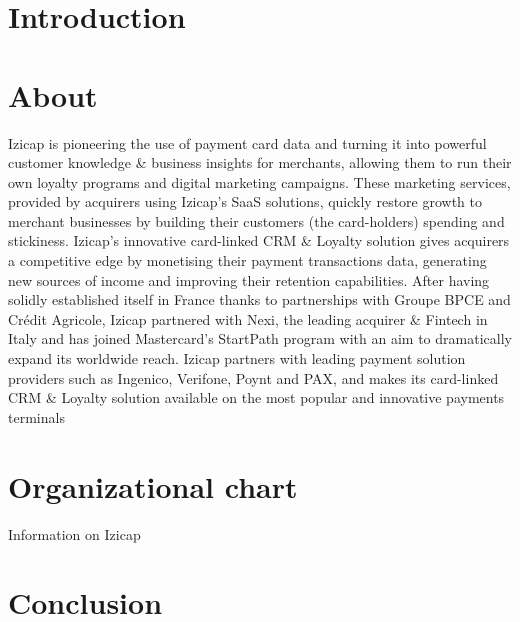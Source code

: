
\section*{Introduction}

\section{About}
Izicap is pioneering the use of payment card data and turning it into powerful customer knowledge \& business
insights for merchants, allowing them to run their own loyalty programs and digital marketing campaigns. These
marketing services, provided by acquirers using Izicap’s SaaS solutions, quickly restore growth to merchant
businesses by building their customers (the card-holders) spending and stickiness. Izicap’s innovative card-linked
CRM \& Loyalty solution gives acquirers a competitive edge by monetising their payment transactions data,
generating new sources of income and improving their retention capabilities. After having solidly established itself in
France thanks to partnerships with Groupe BPCE and Crédit Agricole, Izicap partnered with Nexi, the leading
acquirer \& Fintech in Italy and has joined Mastercard’s StartPath program with an aim to dramatically expand its
worldwide reach. Izicap partners with leading payment solution providers such as Ingenico, Verifone, Poynt and PAX,
and makes its card-linked CRM \& Loyalty solution available on the most popular and innovative payments terminals

\section{Organizational chart}
Information on Izicap

\section*{Conclusion}
